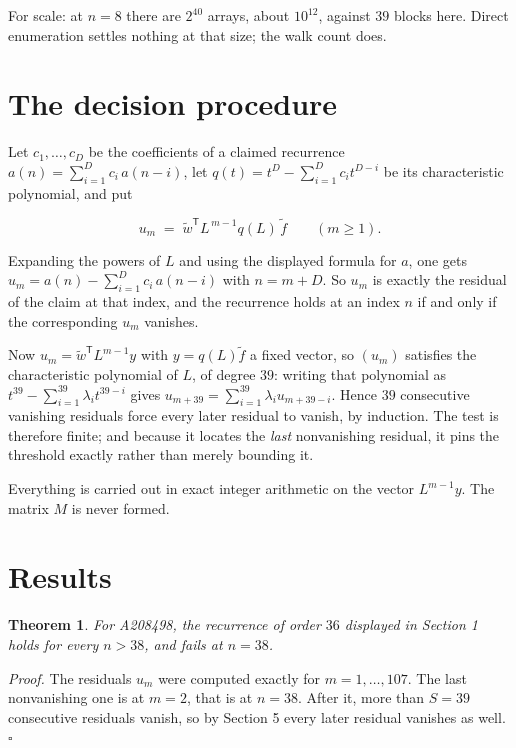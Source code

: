 \documentclass[11pt]{article}
\newtheorem{theorem}{Theorem}
\theoremstyle{definition}
\begin{document}
For scale: at $n = 8$ there are $2^{40}$ arrays, about $10^{12}$, against $39$ blocks here. Direct enumeration settles nothing at that size; the walk count does.

\section{The decision procedure}

Let $c_1,\dots,c_D$ be the coefficients of a claimed recurrence $a(n) = \sum_{i=1}^{D} c_i\,a(n-i)$, let $q(t) = t^{D} - \sum_{i=1}^{D} c_i t^{D-i}$ be its characteristic polynomial, and put

\[u_m \;=\; \tilde w^{\mathsf T} L^{\,m-1} q(L)\,\tilde f \qquad (m \ge 1).\]

Expanding the powers of $L$ and using the displayed formula for $a$, one gets $u_m = a(n) - \sum_{i=1}^{D} c_i\,a(n-i)$ with $n = m + D$. So $u_m$ is exactly the residual of the claim at that index, and the recurrence holds at an index $n$ if and only if the corresponding $u_m$ vanishes.

Now $u_m = \tilde w^{\mathsf T} L^{m-1} y$ with $y = q(L)\tilde f$ a fixed vector, so $(u_m)$ satisfies the characteristic polynomial of $L$, of degree $39$: writing that polynomial as $t^{39} - \sum_{i=1}^{39} \lambda_i t^{39-i}$ gives $u_{m+39} = \sum_{i=1}^{39} \lambda_i u_{m+39-i}$. Hence $39$ consecutive vanishing residuals force every later residual to vanish, by induction. The test is therefore finite; and because it locates the {\itshape last} nonvanishing residual, it pins the threshold exactly rather than merely bounding it.

Everything is carried out in exact integer arithmetic on the vector $L^{m-1}y$. The matrix $M$ is never formed.

\section{Results}

\begin{theorem} For A208498, the recurrence of order $36$ displayed in Section 1 holds for every $n > 38$, and fails at $n = 38$.\end{theorem}

{\itshape Proof.} The residuals $u_m$ were computed exactly for $m = 1,\dots,107$. The last nonvanishing one is at $m = 2$, that is at $n = 38$. After it, more than $S = 39$ consecutive residuals vanish, so by Section 5 every later residual vanishes as well. $\square$
\end{document}
